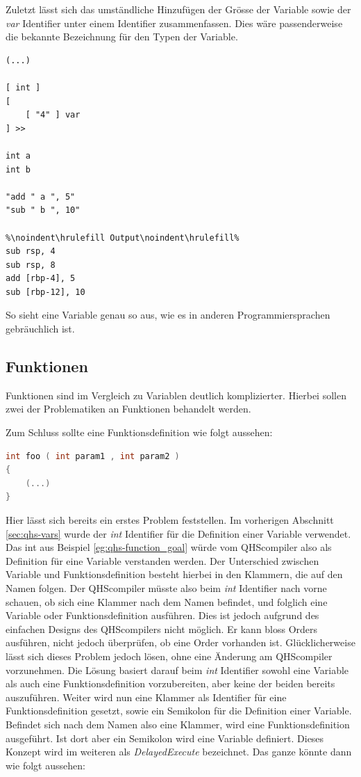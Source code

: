 Zuletzt lässt sich das umständliche Hinzufügen der Grösse der Variable sowie der \textit{var} Identifier unter einem Identifier zusammenfassen. Dies wäre passenderweise die bekannte Bezeichnung für den Typen der Variable.

\begin{lstlisting}[language=QHS, caption=Definition einer Variable mit \textit{int} Identifier]
(...)

[ int ] 
[
    [ "4" ] var
] >>
    
int a 
int b 
    
"add " a ", 5"
"sub " b ", 10"
        
%\noindent\hrulefill Output\noindent\hrulefill%
sub rsp, 4
sub rsp, 8
add [rbp-4], 5
sub [rbp-12], 10
\end{lstlisting}

So sieht eine Variable genau so aus, wie es in anderen Programmiersprachen gebräuchlich ist.

\subsection{Funktionen} \label{sec:qhs-funcs}
Funktionen sind im Vergleich zu Variablen deutlich komplizierter. Hierbei sollen zwei der Problematiken an Funktionen behandelt werden.

Zum Schluss sollte eine Funktionsdefinition wie folgt aussehen:


\begin{lstlisting}[language=C, label=eg:qhs-function_goal, caption=Ziel für die Definition einer Funktion in QHS]
int foo ( int param1 , int param2 )
{
    (...)
}
\end{lstlisting}

Hier lässt sich bereits ein erstes Problem feststellen. Im vorherigen Abschnitt \ref{sec:qhs-vars} wurde der \textit{int} Identifier für die Definition einer Variable verwendet. 
Das int aus Beispiel \ref{eg:qhs-function_goal} würde vom QHScompiler also als Definition für eine Variable verstanden werden. Der Unterschied zwischen Variable und Funktionsdefinition besteht hierbei in den Klammern,
die auf den Namen folgen. Der QHScompiler müsste also beim \textit{int} Identifier nach vorne schauen, ob sich eine Klammer nach dem Namen befindet, und folglich eine Variable oder Funktionsdefinition ausführen.
Dies ist jedoch aufgrund des einfachen Designs des QHScompilers nicht möglich. Er kann bloss Orders ausführen, nicht jedoch überprüfen, ob eine Order vorhanden ist. Glücklicherweise lässt sich dieses Problem jedoch lösen,
ohne eine Änderung am QHScompiler vorzunehmen. Die Lösung basiert darauf beim \textit{int} Identifier sowohl eine Variable als auch eine Funktionsdefinition vorzubereiten, aber keine der beiden bereits auszuführen.
Weiter wird nun eine Klammer als Identifier für eine Funktionsdefinition gesetzt, sowie ein Semikolon für die Definition einer Variable. Befindet sich nach dem Namen also eine Klammer, wird eine Funktionsdefinition ausgeführt.
Ist dort aber ein Semikolon wird eine Variable definiert. Dieses Konzept wird im weiteren als \textit{DelayedExecute} bezeichnet. Das ganze könnte dann wie folgt aussehen:

